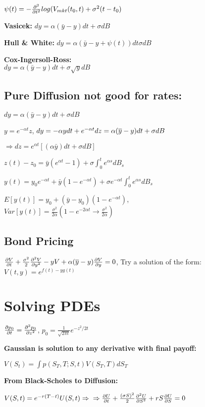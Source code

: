 $\psi(t) = - \ddn{}{t}{2}log(V_{mkt}(t_0, t) + \sigma^2 (t-t_0)$

\textbf{Vasicek:} $dy = \alpha (\bar y - y)dt + \sigma dB$

\textbf{Hull \& White:} $dy = \alpha (\bar y - y + \psi(t))dt \sigma dB$

\textbf{Cox-Ingersoll-Ross:} \\$dy = \alpha (\bar y - y)dt + \sigma \sqrt{y}dB$

\subsection{Pure Diffusion not good for rates:}

$dy = \alpha (\bar y - y) dt + \sigma dB$

$y = e^{-\alpha t} z$, $dy = -\alpha y dt + e^{-\alpha t}dz =\\ \alpha (\bar y - y) dt + \sigma dB$

$\Rightarrow dz = e^{\alpha t}[(\alpha \bar y)dt + \sigma dB]$

$z(t) - z_0 = \bar y (e^{\alpha t} - 1) + \sigma \int_0^t e^{\alpha s}dB_s$

$y(t) = y_0e^{-\alpha t} + \bar y (1-e^{-\alpha t}) + \sigma e^{-\alpha t}\int_0^t e^{\alpha s}dB_s$

$E[y(t)] = y_0 + (\bar y - y_0)(1-e^{-\alpha t})$, \\$Var[y(t)] = \frac{\sigma^2}{2\alpha}(1-e^{-2 \alpha t} \to \frac{\sigma^2}{2 \alpha})$

\subsection{Bond Pricing}
$\dd{V}{t} + \frac{\sigma^2}{2}\ddn{V}{y}{2} - yV + \alpha(\bar y - y )\dd{V}{y} = 0$, 
Try a solution of the form: $V(t, y) = e^{f(t) - yg(t)}$

\section{Solving PDEs}

$\dd{p_0}{t} = \ddn{p_0}{z}{2}$, $p_0 = \frac{1}{\sqrt{2\pi t}} e^{-z^2/2t}$

\textbf{Gaussian is solution to any derivative with final payoff:}

$V(S_t) = \int p(S_T, T; S, t) V (S_T, T) dS_T$

\textbf{From Black-Scholes to Diffusion:}

$V(S,t) = e^{-r (T-t)} U(S,t) \Rightarrow \\ \Rightarrow \dd{U}{t} + \frac{(\sigma S)^2}{2} \ddn{U}{S}{2} + rS\dd{U}{S} = 0$

